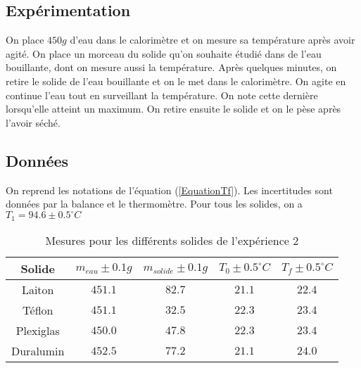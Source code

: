 \documentclass[12pt]{article}
\begin{document}
\subsection{Expérimentation}
On place $450g$ d'eau dans le calorimètre et on mesure sa température après avoir agité. On place un morceau du solide qu'on souhaite étudié dans de l'eau bouillante, dont on mesure aussi la température. Après quelques minutes, on retire le solide de l'eau bouillante et on le met dans le calorimètre. On agite en continue l'eau tout en surveillant la température. On note cette dernière lorsqu'elle atteint un maximum. On retire ensuite le solide et on le pèse après l'avoir séché.

\subsection{Données}
On reprend les notations de l'équation (\ref{EquationTf}). Les incertitudes sont données par la balance et le thermomètre. Pour tous les solides, on a $T_1=94.6\pm 0.5^{\circ}C$
\begin{table}[h!]
	\begin{center}
		\begin{tabular}{|c|c|c|c|c|}
		\hline
		Solide & $m_{eau} \pm 0.1g$ & $m_{solide}\pm 0.1g$ & $T_0\pm 0.5^{\circ}C$ & $T_f\pm 0.5^{\circ}C$\\ \hline
		Laiton & $451.1$ & $82.7$ & $21.1$ & $22.4$ \\
		Téflon & $451.1$ & $32.5$ & $22.3$ & $23.4$ \\
		Plexiglas & $450.0$ & $47.8$ & $22.3$ & $23.4$ \\
		Duralumin & $452.5$ & $77.2$ & $21.1$ & $24.0$ \\ \hline
		\end{tabular}
		\caption{Mesures pour les différents solides de l'expérience 2}
		\label{table:mesureexp2}
	\end{center}
\end{table}
\end{document}
